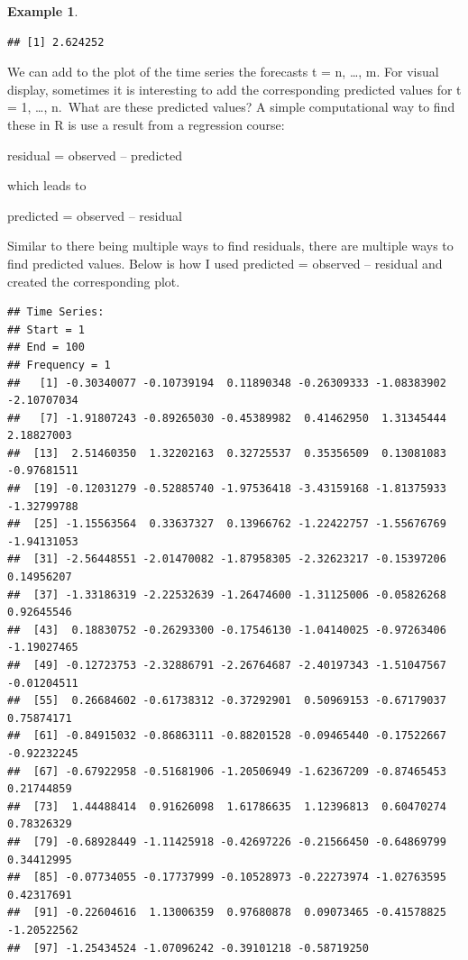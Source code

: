\documentclass[
]{book}
\newenvironment{Shaded}{\begin{snugshade}}{\end{snugshade}}
\newcommand{\CommentTok}[1]{\textcolor[rgb]{0.56,0.35,0.01}{\textit{#1}}}
\newcommand{\NormalTok}[1]{#1}
\newcommand{\SpecialCharTok}[1]{\textcolor[rgb]{0.00,0.00,0.00}{#1}}
\theoremstyle{definition}
\theoremstyle{definition}
\newtheorem{example}{Example}[chapter]
\theoremstyle{definition}
\theoremstyle{definition}
\theoremstyle{remark}
\begin{document}
\begin{example}
\begin{verbatim}
## [1] 2.624252
\end{verbatim}

We can add to the plot of the time series the forecasts t = n, \ldots, m. For visual display, sometimes it is interesting to add the corresponding predicted values for t = 1, \ldots, n.~What are these predicted values? A simple computational way to find these in R is use a result from a regression course:

residual = observed -- predicted

which leads to

predicted = observed -- residual

Similar to there being multiple ways to find residuals, there are multiple ways to find predicted values. Below is how I used predicted = observed -- residual and created the corresponding plot.

\begin{Shaded}
\end{Shaded}

\begin{verbatim}
## Time Series:
## Start = 1 
## End = 100 
## Frequency = 1 
##   [1] -0.30340077 -0.10739194  0.11890348 -0.26309333 -1.08383902 -2.10707034
##   [7] -1.91807243 -0.89265030 -0.45389982  0.41462950  1.31345444  2.18827003
##  [13]  2.51460350  1.32202163  0.32725537  0.35356509  0.13081083 -0.97681511
##  [19] -0.12031279 -0.52885740 -1.97536418 -3.43159168 -1.81375933 -1.32799788
##  [25] -1.15563564  0.33637327  0.13966762 -1.22422757 -1.55676769 -1.94131053
##  [31] -2.56448551 -2.01470082 -1.87958305 -2.32623217 -0.15397206  0.14956207
##  [37] -1.33186319 -2.22532639 -1.26474600 -1.31125006 -0.05826268  0.92645546
##  [43]  0.18830752 -0.26293300 -0.17546130 -1.04140025 -0.97263406 -1.19027465
##  [49] -0.12723753 -2.32886791 -2.26764687 -2.40197343 -1.51047567 -0.01204511
##  [55]  0.26684602 -0.61738312 -0.37292901  0.50969153 -0.67179037  0.75874171
##  [61] -0.84915032 -0.86863111 -0.88201528 -0.09465440 -0.17522667 -0.92232245
##  [67] -0.67922958 -0.51681906 -1.20506949 -1.62367209 -0.87465453  0.21744859
##  [73]  1.44488414  0.91626098  1.61786635  1.12396813  0.60470274  0.78326329
##  [79] -0.68928449 -1.11425918 -0.42697226 -0.21566450 -0.64869799  0.34412995
##  [85] -0.07734055 -0.17737999 -0.10528973 -0.22273974 -1.02763595  0.42317691
##  [91] -0.22604616  1.13006359  0.97680878  0.09073465 -0.41578825 -1.20522562
##  [97] -1.25434524 -1.07096242 -0.39101218 -0.58719250
\end{verbatim}


\end{example}
\end{document}
